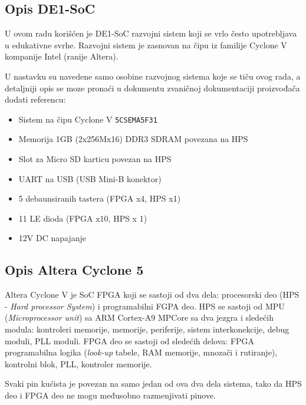 \subsection{Opis DE1-SoC}

U ovom radu korišćen je DE1-SoC razvojni sistem koji se vrlo često upotrebljava u edukativne svrhe. Razvojni sistem je zasnovan na čipu iz familije Cyclone V kompanije Intel (ranije Altera).

U nastavku su navedene samo osobine razvojnog sistema koje se tiču ovog rada, a detaljniji opis se moze pronaći u dokumentu zvaničnoj dokumentaciji proizvođača \cite{de1}
dodati referencu: 
\begin{itemize}
\item Sistem na čipu Cyclone V \texttt{5CSEMA5F31}
\item Memorija 1GB (2x256Mx16) DDR3 SDRAM povezana na HPS
\item Slot za Micro SD karticu povezan na HPS
\item UART na USB (USB Mini-B konektor)
\item 5 debaunsiranih tastera (FPGA x4, HPS x1)
\item 11 LE dioda (FPGA x10, HPS x 1)
\item 12V DC napajanje
\end{itemize}

\subsection{Opis Altera Cyclone 5}
Altera Cyclone V je SoC FPGA koji se sastoji od dva dela: procesorski deo (HPS -  \textit{Hard processor System}) i programabilni FGPA deo. HPS se sastoji od MPU (\textit{Microprocessor unit}) sa ARM Cortex-A9 MPCore sa dva jezgra i sledećih modula: kontroleri memorije, memorije, periferije, sistem interkonekcije, debug moduli, PLL moduli. FPGA deo se sastoji od sledećih delova: FPGA programabilna logika (\textit{look-up} tabele, RAM memorije, mnozači i rutiranje), kontrolni blok, PLL, kontroler memorije.

Svaki pin kućista je povezan na samo jedan od ova dva dela sistema, tako da HPS deo i FPGA deo ne mogu međusobno razmenjivati pinove.

